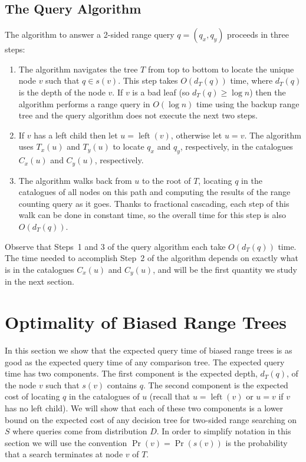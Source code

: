 \documentclass[charterfonts]{patmorin}
\DeclareMathOperator{\lft}{left}
\begin{document}
\subsection{The Query Algorithm}

The algorithm to answer a 2-sided range query $q=(q_x,q_y)$ proceeds
in three steps:

\begin{enumerate}

\item The algorithm navigates the tree $T$ from top to bottom to
locate the unique node $v$ such that $q\in s(v)$. This step takes
$O(d_T(q))$ time, where $d_T(q)$ is the depth of the node $v$.  If $v$
is a bad leaf (so $d_T(q)\ge \log n$) then the algorithm performs a
range query in $O(\log n)$ time using the backup range tree and the
query algorithm does not execute the next two steps.

\item  If $v$ has a left child then let $u=\lft(v)$, otherwise let
$u=v$. The algorithm uses $T_x(u)$ and $T_y(u)$ to locate $q_x$ and
$q_y$, respectively, in the catalogues $C_x(u)$ and $C_y(u)$,
respectively.

\item The algorithm walks back from $u$ to the root of $T$, locating
$q$ in the catalogues of all nodes on this path and computing the
results of the range counting query as it goes.  Thanks to fractional
cascading, each step of this walk can be done in constant time, so the
overall time for this step is also $O(d_T(q))$.
\end{enumerate}

Observe that Steps~1 and 3 of the query algorithm each take
$O(d_T(q))$ time.  The time needed to accomplish Step~2 of the
algorithm depends on exactly what is in the catalogues $C_x(u)$ and
$C_y(u)$, and will be the first quantity we study in the next section.

\section{Optimality of Biased Range Trees}

In this section we show that the expected query time of biased range
trees is as good as the expected query time of any comparison tree.
The expected query time has two components.  The first component is
the expected depth, $d_T(q)$,  of the node $v$ such that $s(v)$
contains $q$.  The second component is the expected cost of locating
$q$ in the catalogues of $u$ (recall that $u=\lft(v)$ or $u=v$ if $v$
has no left child).  We will show that each of these two components
is a lower bound on the expected cost of any decision tree for
two-sided range searching on $S$ where queries come from distribution
$D$.  In order to simplify notation in this section we will use the
convention $\Pr(v)=\Pr(s(v))$ is the probability that a search
terminates at node $v$ of $T$.  
\end{document}

